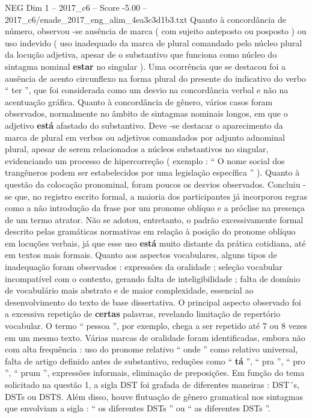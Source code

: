 \begin{textsample}{NEG Dim 1 – 2017\_c6 – Score -5.00 – 2017\_c6/enade\_2017\_eng\_alim\_4ea3c3d1b3.txt}
Quanto à concordância de número, observou -se ausência de marca ( com sujeito anteposto ou posposto ) ou uso indevido ( uso inadequado da marca de plural comandado pelo núcleo plural da locução adjetiva, apesar de o substantivo que funciona como núcleo do sintagma nominal \textbf{estar} no singular ).
Uma ocorrência que se destacou foi a ausência de acento circunflexo na forma plural do presente do indicativo do verbo “ ter ”, que foi considerada como um desvio na concordância verbal e não na acentuação gráfica.
Quanto à concordância de gênero, vários casos foram observados, normalmente no âmbito de sintagmas nominais longos, em que o adjetivo \textbf{está} afastado do substantivo.
Deve -se destacar o aparecimento da marca de plural em verbos ou adjetivos comandados por adjunto adnominal plural, apesar de serem relacionados a núcleos substantivos no singular, evidenciando um processo de hipercorreção ( exemplo : “ O nome social dos trangêneros podem ser estabelecidos por uma legislação específica ” ).
Quanto à questão da colocação pronominal, foram poucos os desvios observados.
Concluiu -se que, no registro escrito formal, a maioria dos participantes já incorporou regras como a não introdução da frase por um pronome oblíquo e a próclise na presença de um termo atrator.
Não se adotou, entretanto, o padrão excessivamente formal descrito pelas gramáticas normativas em relação à posição do pronome oblíquo em locuções verbais, já que esse uso \textbf{está} muito distante da prática cotidiana, até em textos mais formais.
Quanto aos aspectos vocabulares, alguns tipos de inadequação foram observados : expressões da oralidade ; seleção vocabular incompatível com o contexto, gerando falta de inteligibilidade ; falta de domínio de vocabulário mais abstrato e de maior complexidade, essencial ao desenvolvimento do texto de base dissertativa.
O principal aspecto observado foi a excessiva repetição de \textbf{certas} palavras, revelando limitação de repertório vocabular.
O termo “ pessoa ”, por exemplo, chega a ser repetido até 7 ou 8 vezes em um mesmo texto.
Várias marcas de oralidade foram identificadas, embora não com alta frequência : uso do pronome relativo “ onde ” como relativo universal, falta de artigo definido antes de substantivo, reduções como “ \textbf{tá} ”, “ pra ”, “ pro ”, “ prum ”, expressões informais, eliminação de preposições.
Em função do tema solicitado na questão 1, a sigla DST foi grafada de diferentes maneiras : DST´s, DSTs ou DSTS.
Além disso, houve flutuação de gênero gramatical nos sintagmas que envolviam a sigla : “ os diferentes DSTs ” ou “ as diferentes DSTs ”.

\end{textsample}
